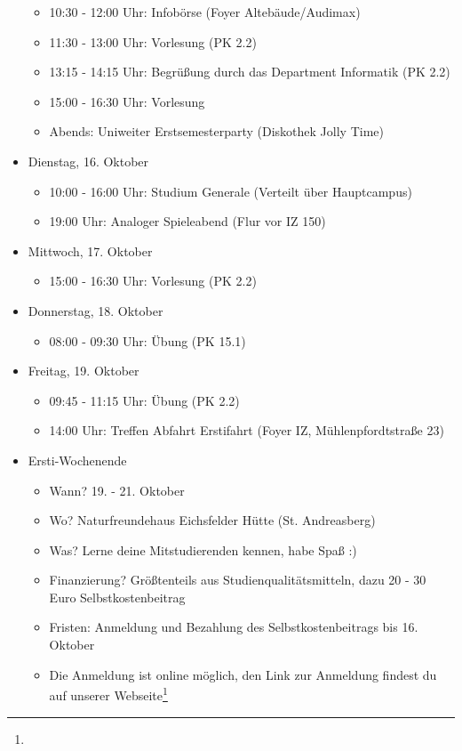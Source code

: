 \begin{itemize}
\begin{itemize}
            \item 10:30 - 12:00 Uhr: Infobörse  (Foyer Altebäude/Audimax)
            \item 11:30 - 13:00 Uhr: Vorlesung  (PK 2.2)
            \item 13:15 - 14:15 Uhr: Begrüßung durch das Department Informatik (PK 2.2)
            \item 15:00 - 16:30 Uhr: Vorlesung 
            \item Abends: Uniweiter Erstsemesterparty (Diskothek Jolly Time)
        \end{itemize}
    \item Dienstag, 16. Oktober
        \begin{itemize}
            \item 10:00 - 16:00 Uhr: Studium Generale (Verteilt über Hauptcampus)
            \item 19:00 Uhr: Analoger Spieleabend (Flur vor IZ 150)
        \end{itemize}
    \item Mittwoch, 17. Oktober
        \begin{itemize}
            \item 15:00 - 16:30 Uhr: Vorlesung  (PK 2.2)
        \end{itemize}
    \item Donnerstag, 18. Oktober
        \begin{itemize}
            \item 08:00 - 09:30 Uhr: Übung  (PK 15.1)
        \end{itemize}
    \item Freitag, 19. Oktober
        \begin{itemize}
            \item 09:45 - 11:15 Uhr: Übung  (PK 2.2)
            \item 14:00 Uhr: Treffen Abfahrt Erstifahrt (Foyer IZ, Mühlenpfordtstraße 23)
        \end{itemize}
    \item Ersti-Wochenende
        \begin{itemize}
            \item Wann? 19. - 21. Oktober
            \item Wo? Naturfreundehaus Eichsfelder Hütte (St. Andreasberg)
            \item Was? Lerne deine Mitstudierenden kennen, habe Spaß :)
            \item Finanzierung? Größtenteils aus Studienqualitätsmitteln, dazu 20 - 30 Euro Selbstkostenbeitrag
            \item Fristen: Anmeldung und Bezahlung des Selbstkostenbeitrags bis 16. Oktober
            \item Die Anmeldung ist online möglich, den Link zur Anmeldung findest du auf unserer Webseite\footnote{}
        \end{itemize}
\end{itemize}
